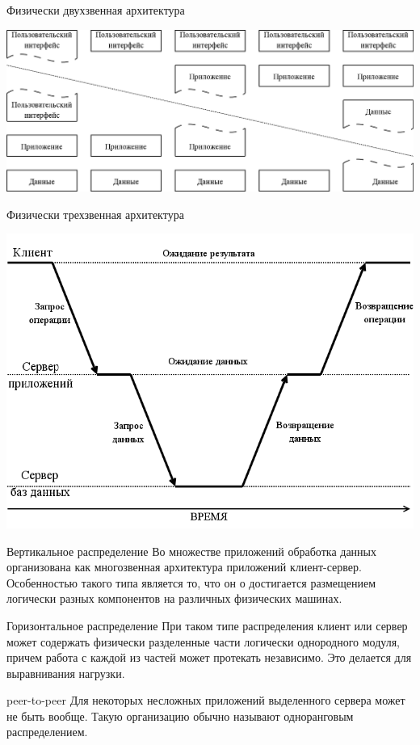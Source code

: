 \begin{frame}{Физически двухзвенная архитектура}
	\begin{center}
		\includegraphics[width=1\textwidth]{07-2_layers.png}
	\end{center}
\end{frame}

\begin{frame}{Физически трехзвенная архитектура}
	\begin{center}
		\includegraphics[height=0.8\textheight]{07-3_layers.png}
	\end{center}
\end{frame}


\begin{frame}{}
	\begin{block}{Вертикальное распределение}
Во множестве приложений обработка данных организована как многозвенная архитектура приложений клиент-сервер.
Особенностью такого типа является то,   что он    о достигается размещением логически разных компонентов на различных физических машинах.
	\end{block}
	\pause
	\begin{block}{Горизонтальное распределение}
При таком типе распределения клиент или сервер может содержать физически разделенные части логически однородного модуля,  причем работа с каждой из частей может протекать независимо. Это делается для выравнивания нагрузки.
	\end{block}
	\pause
	\begin{block}{peer-to-peer}
Для некоторых несложных приложений выделенного сервера может не быть вообще. Такую организацию обычно называют одноранговым распределением.
	\end{block}
\end{frame}

